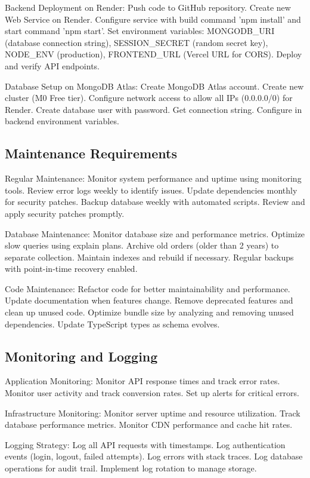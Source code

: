 ﻿\documentclass[11pt]{article}
\begin{document}
Backend Deployment on Render: Push code to GitHub repository. Create new Web Service on Render. Configure service with build command 'npm install' and start command 'npm start'. Set environment variables: MONGODB\_URI (database connection string), SESSION\_SECRET (random secret key), NODE\_ENV (production), FRONTEND\_URL (Vercel URL for CORS). Deploy and verify API endpoints.

Database Setup on MongoDB Atlas: Create MongoDB Atlas account. Create new cluster (M0 Free tier). Configure network access to allow all IPs (0.0.0.0/0) for Render. Create database user with password. Get connection string. Configure in backend environment variables.

\subsection{Maintenance Requirements}
Regular Maintenance: Monitor system performance and uptime using monitoring tools. Review error logs weekly to identify issues. Update dependencies monthly for security patches. Backup database weekly with automated scripts. Review and apply security patches promptly.

Database Maintenance: Monitor database size and performance metrics. Optimize slow queries using explain plans. Archive old orders (older than 2 years) to separate collection. Maintain indexes and rebuild if necessary. Regular backups with point-in-time recovery enabled.

Code Maintenance: Refactor code for better maintainability and performance. Update documentation when features change. Remove deprecated features and clean up unused code. Optimize bundle size by analyzing and removing unused dependencies. Update TypeScript types as schema evolves.

\subsection{Monitoring and Logging}
Application Monitoring: Monitor API response times and track error rates. Monitor user activity and track conversion rates. Set up alerts for critical errors.

Infrastructure Monitoring: Monitor server uptime and resource utilization. Track database performance metrics. Monitor CDN performance and cache hit rates.

Logging Strategy: Log all API requests with timestamps. Log authentication events (login, logout, failed attempts). Log errors with stack traces. Log database operations for audit trail. Implement log rotation to manage storage.
\end{document}
